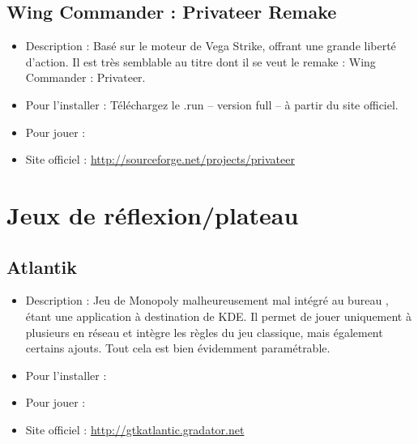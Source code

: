\subsection{Wing Commander : Privateer Remake}
\begin{itemize}
\begingroup
{}
\item Description : Basé sur le moteur de Vega Strike, offrant une grande liberté d'action. Il est très semblable au titre dont il se veut le remake : Wing Commander : Privateer.{\par}
\item Pour l'installer : Téléchargez le .run -- version full -- à partir du site officiel.{\par}
\item Pour jouer : 
\item Site officiel : \url{http://sourceforge.net/projects/privateer}{\par}
\endgroup
\end{itemize}
\section{Jeux de réflexion/plateau}
\subsection{Atlantik}
\begin{itemize}
\begingroup
{}
\item Description : Jeu de Monopoly malheureusement mal intégré au bureau , étant une application à destination de KDE. Il permet de jouer uniquement à plusieurs en réseau et intègre les règles du jeu classique, mais également certains ajouts. Tout cela est bien évidemment paramétrable.{\par}
\endgroup
\item Pour l'installer : 
\item Pour jouer : 
\item Site officiel : \url{http://gtkatlantic.gradator.net}{\par}
\end{itemize}
